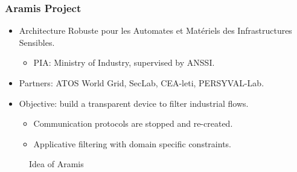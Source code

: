 \documentclass{beamer}
\newcommand{\aramis}{Aramis\xspace}
\begin{document}
\begin{frame}
    \frametitle{\aramis Project}%

    \begin{itemize}
        \item Architecture Robuste pour les Automates et Mat\'eriels des Infrastructures Sensibles.
        \begin{itemize}
            \item PIA: Ministry of Industry, supervised by ANSSI.
        \end{itemize}
            \vspace{1em}
        \item Partners: ATOS World Grid, SecLab, CEA-leti, PERSYVAL-Lab.
            \vspace{1em}
        \item Objective: build a transparent device to filter industrial flows.
        \begin{itemize}
            \item Communication protocols are stopped and re-created.
            \item Applicative filtering with domain specific constraints.
        \end{itemize}
    \end{itemize}
    \begin{figure}[htb]
        \resizebox{.8\columnwidth}{!}{
            
        }
        \caption{Idea of \aramis}
    \end{figure}
\end{frame}

%
\end{document}
